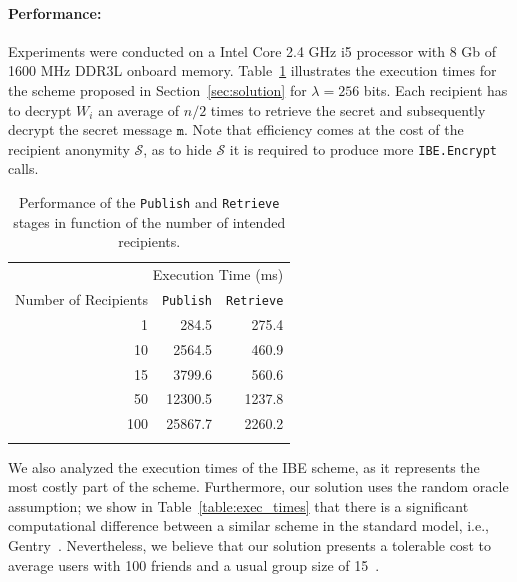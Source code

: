 \documentclass[journal]{IEEEtran}
\newcommand{\tabref}[1]{{Table}~\ref{#1}}
\newcommand{\secref}[1]{{Section}~\ref{#1}}
\newcommand{\msg}{\ensuremath{\mathtt{m}}}
\newcommand{\ms}{\ensuremath{ms}}
\begin{document}
\paragraph{Performance:} 
Experiments were conducted on a Intel Core 2.4 GHz i5 processor with 8 Gb of 1600 MHz DDR3L onboard memory. Table~\ref{table:BE_exec_times} illustrates the 
execution times for the scheme proposed in \secref{sec:solution} for $\lambda=256$ bits. Each recipient has to decrypt $W_i$ an average of $n/2$ times to retrieve the secret and subsequently decrypt the secret message \msg. Note that efficiency comes at the cost of the recipient anonymity $\mathcal{S}$, as to hide $\mathcal{S}$ it is required to produce more \texttt{IBE.Encrypt} calls.

\begin{table}
  \centering
  \begin{tabular}{@{}rrr@{}} \toprule
    \multicolumn{3}{r}{Execution Time (ms)} \\ \cmidrule(r){2-3}
    Number of Recipients & \texttt{Publish} & \texttt{Retrieve} \\ \midrule
    1 & 284.5 & 275.4  \\
    10 & 2564.5  & 460.9  \\
    15 & 3799.6  & 560.6  \\
    50 & 12300.5  & 1237.8  \\
    100 & 25867.7  & 2260.2  \\  \bottomrule
    & & \\
  \end{tabular}
  \caption{Performance of the \texttt{Publish} and \texttt{Retrieve} stages in function of the number of intended recipients.}
  \label{table:BE_exec_times}
\end{table}

We also analyzed the execution times of the IBE scheme, as it represents the most costly part of the scheme. Furthermore, our solution uses the random oracle assumption; we show in \tabref{table:exec_times} that there is a significant computational difference between a similar scheme in the standard model, i.e., Gentry~\cite{GentryRandomOracles}.
Nevertheless, we believe that our solution presents a tolerable cost to average users with 100 friends and a usual group size of 15~\cite{DBLP:journals/corr/abs-1111-4503}. 
\end{document}
